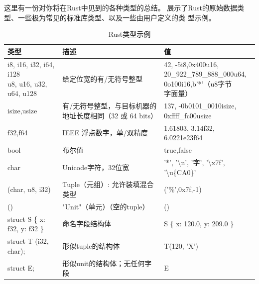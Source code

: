 \medskip
这里有一份对你将在Rust中见到的各种类型的总结。 展示了Rust的原始数据类型、一些极为常见的标准库类型、以及一些由用户定义的类
型示例。

\smallskip
\begin{table}[h]
    \small
    \caption{Rust类型示例}\label{TABLE3-1}
    \begin{tabularx}{\linewidth}{X p{200pt} X}
        \toprule
        \textbf{类型} & \textbf{描述} & \textbf{值} \\
        \midrule
        \makecell[lt]{i8, i16, i32, i64, i128 \\ u8, u16, u32, u64, u128}
        & 给定位宽的有/无符号整型 
        & \makecell[lt]{42, -5i8,0x400u16, \\ 20\_922\_789\_888\_000u64, \\ 0o100i16,b'*'（u8字节\\字面量）} \\
        
        isize,usize 
        & 有/无符号整型，与目标机器的地址长度相同（32 或 64 bits）
        & \makecell[lt]{137, -0b0101\_0010isize, \\ 0xffff\_fc00usize} \\

        f32,f64
        & IEEE 浮点数字，单/双精度
        & \makecell[lt]{1.61803, 3.14f32, \\ 6.0221e23f64} \\
        
        bool & 布尔值 & true,false \\

        char
        & Unicode字符，32位宽
        & '*', '\textbackslash n', '字', '\textbackslash x7f', '\textbackslash u\{CA0\}' \\
        
        (char, u8, i32) & Tuple（元组）: 允许装填混合类型 & ('\%',0x7f,-1) \\

        () & "Unit"（单元）（空的tuple）& () \\

        struct S \{ x: f32, y: f32 \} & 命名字段结构体 & S \{ x: 120.0, y: 209.0 \} \\
        
        struct T (i32, char); & 形似tuple的结构体 & T(120, 'X') \\
        
        struct E; & 形似unit的结构体；无任何字段 & E \\


\end{tabularx}
\end{table}
